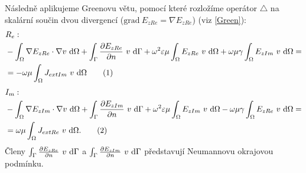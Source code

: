 \documentclass[12pt,a4paper,oneside]{article}
\numberwithin{equation}{section} %
\numberwithin{figure}{section} %
\numberwithin{table}{section} %
\newcommand{\grad}{\mathrm{grad}\ }
\newcommand\numberthis{\addtocounter{equation}{1}\tag{\theequation}}
\begin{document}
Následně aplikujeme Greenovu větu, pomocí které rozložíme operátor $\triangle$ na skalární součin dvou divergencí ($\grad E _{zRe} = \nabla E _{zRe}$) (viz \ref{Green}):
\begin{align*}
&R_e:
\\
&- \int _{\Omega} \nabla E _{zRe} \cdot \nabla v ~ \ud \Omega + \int _{\Gamma} \frac{\partial E _{zRe}}{\partial n} ~ v ~ \ud \Gamma + \omega ^2 \varepsilon \mu \int _{\Omega} E _{zRe} ~ v ~ \ud \Omega + \omega \mu \gamma \int _{\Omega} E _{zIm} ~ v ~ \ud \Omega = 
\\
&= - \omega \mu \int _{\Omega} J _{extIm} ~ v ~ \ud \Omega
\numberthis
\end{align*}
\begin{align*}
&I_m:
\\
&- \int _{\Omega} \nabla E _{zIm} \cdot \nabla v ~ \ud \Omega + \int _{\Gamma} \frac{\partial E _{zIm}}{\partial n} ~ v ~ \ud \Gamma + \omega ^2 \varepsilon \mu \int _{\Omega} E _{zIm} ~ v ~ \ud \Omega - \omega \mu \gamma \int _{\Omega} E _{zRe} ~ v ~ \ud \Omega = 
\\
&= \omega \mu \int _{\Omega} J _{extRe} ~ v ~ \ud \Omega .
\numberthis
\end{align*}
Členy $\int _{\Gamma} \frac{\partial E _{zRe}}{\partial n} ~ v ~ \mathrm{d} \Gamma$ a $\int _{\Gamma} \frac{\partial E _{zIm}}{\partial n} ~ v ~ \mathrm{d} \Gamma$ představují Neumannovu okrajovou podmínku. 
\end{document}
